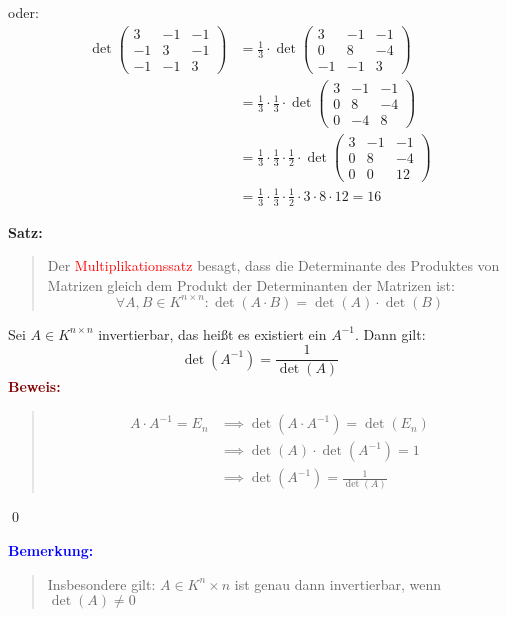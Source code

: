\documentclass{article}
\newcommand{\red}[1]{\textcolor{red}{#1}}
\newcommand{\blue}[1]{\textcolor{blue}{#1}}
\newcommand{\dgr}[1]{\textcolor{dgr}{#1}}
\newcommand{\maroon}[1]{\textcolor{maroon}{#1}}
\newcommand{\an}[1]{\blue{\textbf{Bemerkung: }}\begin{quote}#1\end{quote}}
\newcommand{\se}[1]{\dgr{\textbf{Satz: }}\begin{quote}#1\end{quote}}
\newcommand{\pr}[1]{\maroon{\textbf{Beweis: }}\begin{quote}#1\end{quote}\qed}
\begin{document}
oder:
\begin{align*}
    \det \begin{pmatrix}
        3 & -1 & -1\\
        -1 & 3 & -1\\
        -1 & -1 & 3
    \end{pmatrix} &= \frac{1}{3} \cdot \det \begin{pmatrix}
        3 & -1 & -1\\
        0 & 8 & -4\\
        -1 & -1 & 3
    \end{pmatrix}\\
    &= \frac{1}{3} \cdot \frac{1}{3} \cdot \det \begin{pmatrix}
        3 & -1 & -1\\
        0 & 8 & -4\\
        0 & -4 & 8
    \end{pmatrix}\\
    &= \frac{1}{3} \cdot \frac{1}{3} \cdot \frac{1}{2} \cdot \det \begin{pmatrix}
        3 & -1 & -1\\
        0 & 8 & -4\\
        0 & 0 & 12
    \end{pmatrix}\\
    &= \frac{1}{3} \cdot \frac{1}{3} \cdot \frac{1}{2} \cdot 3 \cdot 8 \cdot 12 = 16
\end{align*}

\se{
    Der \red{Multiplikationssatz} besagt, dass die Determinante des Produktes von Matrizen gleich dem Produkt der Determinanten der Matrizen ist:
    \[
        \forall A,B \in K^{n \times n}: \det(A \cdot B) = \det(A) \cdot \det(B)
    \]
}

Sei $A \in K ^{n \times n}$ invertierbar, das heißt es existiert ein $A^{-1}$. Dann gilt:
\[
    \det(A^{-1}) = \frac{1}{\det(A)}
\]
\pr{
    \vspace{-3em}
    \begin{align*}
        A \cdot A^{-1} = E_n &\implies \det(A \cdot A^{-1} ) = \det(E_n)\\
        &\implies \det(A) \cdot \det(A^{-1}) = 1\\
        &\implies \det(A^{-1}) = \frac{1}{\det(A)}
    \end{align*}
}

\an{
    Insbesondere gilt: $A \in K^n \times n$ ist genau dann invertierbar, wenn $\det(A) \neq 0$
}
\end{document}
